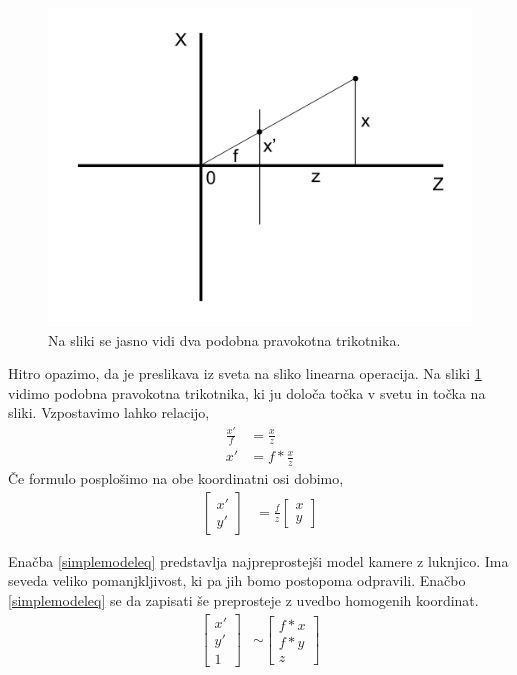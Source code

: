 \documentclass[a4paper, 12pt]{book}
\begin{document}
\begin{figure}[H]
\centering
\includegraphics[width=\textwidth,height=\textheight,keepaspectratio]{similar_triangles_2.png}
\caption{Na sliki se jasno vidi dva podobna pravokotna trikotnika.}
\label{similar2}
\end{figure}

Hitro opazimo, da je preslikava iz sveta na sliko linearna operacija. Na sliki \ref{similar2} vidimo podobna pravokotna trikotnika, ki ju določa točka v svetu in točka na sliki. Vzpostavimo lahko relacijo,
\begin{align}
\frac{x'}{f} &= \frac{x}{z} \\
x' &= f * \frac{x}{z}
\end{align}
Če formulo posplošimo na obe koordinatni osi dobimo,
\begin{align}
\begin{bmatrix}
x' \\
y'
\end{bmatrix}
&= \frac{f}{z}
\begin{bmatrix}
x \\
y
\end{bmatrix}
\label{simplemodeleq}
\end{align}

Enačba \eqref{simplemodeleq} predstavlja najpreprostejši model kamere z luknjico. Ima seveda veliko pomanjkljivost, ki pa jih bomo postopoma odpravili. Enačbo \eqref{simplemodeleq} se da zapisati še preprosteje z uvedbo homogenih koordinat.
\begin{align}
\begin{bmatrix}
x' \\
y' \\
1
\end{bmatrix}
&\sim 
\begin{bmatrix}
f*x \\
f*y \\
z
\end{bmatrix}
\end{align}
\end{document}
